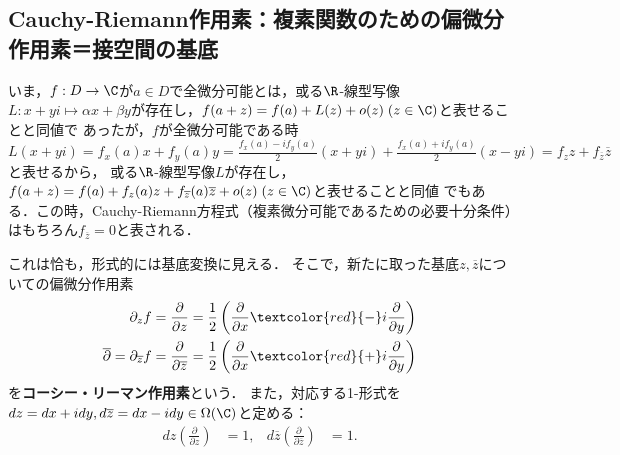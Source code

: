 \documentclass[uplatex, dvipdfmx]{jsreport}
\begin{document}
\subsection{Cauchy-Riemann作用素：複素関数のための偏微分作用素＝接空間の基底}

\begin{discussion}\label{discussion-CR-equation}
    いま，$f:D\to\C$が$a\in D$で全微分可能とは，或る$\R$-線型写像$L:x+yi\mapsto\alpha x+\beta y$が存在し，$f(a+z)=f(a)+L(z)+o(z)\;(z\in\C)$と表せることと同値で
    あったが，$f$が全微分可能である時$L(x+yi)=f_x(a)x+f_y(a)y=\frac{f_x(a)-if_y(a)}{2}(x+yi)+\frac{f_x(a)+if_y(a)}{2}(x-yi)=f_zz+f_{\overline{z}}\overline{z}$と表せるから，
    或る$\R$-線型写像$L$が存在し，$f(a+z)=f(a)+f_z(a)z+f_{\overline{z}}(a)\overline{z}+o(z)\;(z\in\C)$と表せることと同値
    でもある．この時，Cauchy-Riemann方程式（複素微分可能であるための必要十分条件）はもちろん$f_{\overline{z}}=0$と表される．
\end{discussion}

\begin{definition}\label{def-CR-operator}
    これは恰も，形式的には基底変換に見える．
    そこで，新たに取った基底$z,\overline{z}$についての偏微分作用素
    \begin{align*}
        \partial_zf&=\frac{\partial}{\partial z}=\frac{1}{2}\left(\frac{\partial}{\partial x}\textcolor{red}{-}i\frac{\partial}{\partial y}\right)\\
        \overline{\partial}=\partial_{\overline{z}}f&=\frac{\partial}{\partial\overline{z}}=\frac{1}{2}\left(\frac{\partial}{\partial x}\textcolor{red}{+}i\frac{\partial}{\partial y}\right)
    \end{align*}
    を\textbf{コーシー・リーマン作用素}という．
    また，対応する1-形式を$dz=dx+idy,d\overline{z}=dx-idy\in\Omega(\C)$と定める：
    \begin{align*}
        dz\left(\frac{\partial}{\partial z}\right)&=1, &d\overline{z}\left(\frac{\partial}{\partial\overline{z}}\right)&=1.
    \end{align*}
\end{definition}
\end{document}
